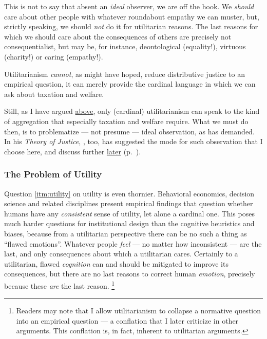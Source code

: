 This is not to say that absent an \emph{ideal} observer, we are off the hook.
We \emph{should} care about other people with whatever roundabout empathy we can muster, but, strictly speaking, we should \emph{not} do it for utilitarian reasons.
The last reasons for which we should care about the consequences of others are precisely not consequentialist, but may be, for instance, deontological (equality!), virtuous (charity!) or caring (empathy!).

Utilitarianism \emph{cannot}, as \cite{Bentham1789} might have hoped, reduce distributive justice to an empirical question, it can merely provide the cardinal language in which we can ask about taxation and welfare.

Still, as I have argued \hyperref[sec:consequentialism]{above}, only (cardinal) utilitarianism can speak to the kind of aggregation that especially taxation and welfare require.%
What we must do then, is to problematize --- not presume --- ideal observation, as \citealt{Rawls1988} has demanded.
In his \emph{Theory of Justice}, \citeauthor{Rawls-1971}, too, has suggested the mode for such observation that I choose here, and discuss further \hyperref[sec:fair]{later} (p.~\pageref{sec:fair}).

\subsubsection[Utility]{The Problem of Utility}
	\label{sec:utility}

Question \ref{itm:utility} on utility is even thornier.
Behavioral economics, decision science and related disciplines present empirical findings that question whether humans have any \emph{consistent} sense of utility, let alone a cardinal one.
This poses much harder questions for institutional design than the cognitive heuristics and biases, because from a utilitarian perspective there can be no such a thing as ``flawed emotions''.
Whatever people \emph{feel} --- no matter how inconsistent --- are the last, and only consequences about which a utilitarian cares.
Certainly to a utilitarian, flawed \emph{cognition} can and should be mitigated to improve its consequences, but there are no last reasons to correct human \emph{emotion}, precisely because these \emph{are} the last reason.
\footnote{
	Readers may note that I allow utilitarianism to collapse a normative question into an empirical question --- a conflation that I later criticize in other arguments.
	This conflation is, in fact, inherent to utilitarian arguments.
}

